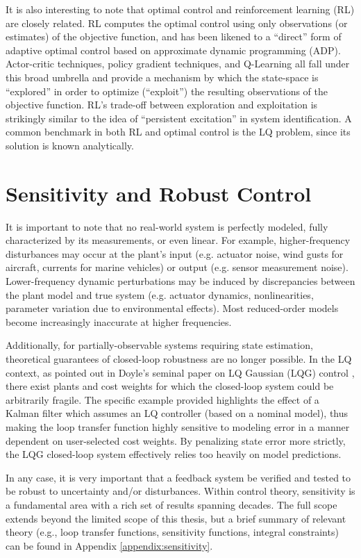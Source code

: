It is also interesting to note that optimal control and reinforcement learning (RL) are closely related.  RL computes the optimal control using only observations (or estimates) of the objective function, and has been likened to a ``direct'' \cite{slotineli} form of adaptive optimal control \cite{sutton1992reinforcement} based on approximate dynamic programming (ADP).  Actor-critic techniques, policy gradient techniques, and Q-Learning all fall under this broad umbrella and provide a mechanism by which the state-space is ``explored'' in order to optimize (``exploit'') the resulting observations of the objective function.  RL's trade-off between exploration and exploitation is strikingly similar to the idea of ``persistent excitation'' in system identification.  A common benchmark in both RL and optimal control is the LQ problem, since its solution is known analytically.

\section{Sensitivity and Robust Control}
\label{chap:introRobustnessAnalysis}
It is important to note that no real-world system is perfectly modeled, fully characterized by its measurements, or even linear.  For example, higher-frequency disturbances may occur at the plant's input (e.g. actuator noise, wind gusts for aircraft, currents for marine vehicles) or output (e.g. sensor measurement noise).  Lower-frequency dynamic perturbations may be induced by discrepancies between the plant model and true system (e.g. actuator dynamics, nonlinearities, parameter variation due to environmental effects).  Most reduced-order models become increasingly inaccurate at higher frequencies.

Additionally, for partially-observable systems requiring state estimation, theoretical guarantees of closed-loop robustness are no longer possible.  In the LQ context, as pointed out in Doyle's seminal paper on LQ Gaussian (LQG) control \cite{doyle1978guaranteed}, there exist plants and cost weights for which the closed-loop system could be arbitrarily fragile.  The specific example provided highlights the effect of a Kalman filter which assumes an LQ controller (based on a nominal model), thus making the loop transfer function highly sensitive to modeling error in a manner dependent on user-selected cost weights.  By penalizing state error more strictly, the LQG closed-loop system effectively relies too heavily on model predictions.

In any case, it is very important that a feedback system be verified and tested to be robust to uncertainty and/or disturbances.  Within control theory, sensitivity is a fundamental area with a rich set of results spanning decades.  The full scope extends beyond the limited scope of this thesis, but a brief summary of relevant theory (e.g., loop transfer functions, sensitivity functions, integral constraints) can be found in Appendix \ref{appendix:sensitivity}.

